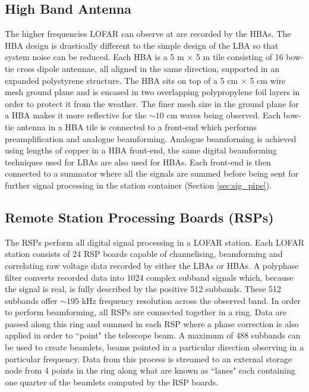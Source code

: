 \subsection{High Band Antenna}
The higher frequencies LOFAR can observe at are recorded by the HBAs. The HBA design is drastically different to the simple design of the LBA so that system noise can be reduced. Each HBA is a 5 m $\times$ 5 m tile consisting of 16 bow-tie cross dipole antennae, all aligned in the same direction, supported in an expanded polystyrene structure. The HBA sits on top of a 5 cm $\times$ 5 cm wire mesh ground plane and is encased in two overlapping polypropylene foil layers in order to protect it from the weather. The finer mesh size in the ground plane for a HBA makes it more reflective for the $\sim 10$ cm waves being observed.%
Each bow-tie antenna in a HBA tile is connected to a front-end which performs preamplification and analogue beamforming. Analogue beamforming is achieved using lengths of copper in a HBA front-end, the same digital beamforming techniques used for LBAs are also used for HBAs.
Each front-end is then connected to a summator where all the signals are summed before being sent for further signal processing in the station container (Section \ref{sec:sig_pipe}). 

\subsection{Remote Station Processing Boards (RSPs)}
\label{sec:rsp}
The RSPs perform all digital signal processing in a LOFAR station. Each LOFAR station consists of 24 RSP boards capable of channelising, beamforming and correlating raw voltage data recorded by either the LBAs or HBAs. A polyphase filter converts recorded data into 1024 complex subband signals which, because the signal is real, is fully described by the positive 512 subbands. These 512 subbands offer $\sim 195$ kHz frequency resolution across the observed band.
In order to perform beamforming, all RSPs are connected together in a ring. Data are passed along this ring and summed in each RSP where a phase correction is also applied in order to ``point" the telescope beam. A maximum of 488 subbands can be used to create beamlets, beams pointed in a particular direction observing in a particular frequency. Data from this process is streamed to an external storage node from 4 points in the ring along what are known as ``lanes" each containing one quarter of the beamlets computed by the RSP boards. 

